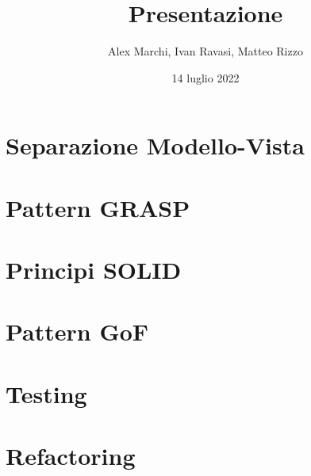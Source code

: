 \documentclass{beamer}
\begin{document}
    \title{Presentazione}
    \author{Alex Marchi, Ivan Ravasi, Matteo Rizzo}
    \date{14 luglio 2022}

    \frame{\titlepage}


    \section{Separazione Modello-Vista}
    

    \section{Pattern GRASP}
    

    \section{Principi SOLID}
    

    \section{Pattern GoF}
    

    \section{Testing}
    

    \section{Refactoring}
    
\end{document}
